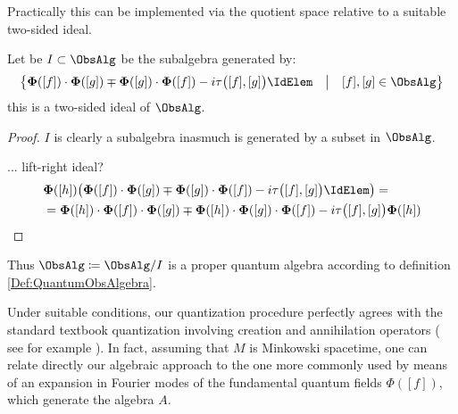 \documentclass[Main]{subfiles}
\begin{document}
   		 		Practically this can be implemented via the quotient space relative to a suitable two-sided ideal.
   		 		\begin{proposition}
   		 			Let be $I \subset \ObsAlg$ be the subalgebra generated by:
   		 				\begin{displaymath}
   		 					\big\{
   		 					 \mathbf{\Phi}([f]) \cdot \mathbf{\Phi}([g])  \mp \mathbf{\Phi}([g]) \cdot \mathbf{\Phi}([f]) - 
   		 				i \tau\big( [f], [g] \big)\IdElem \quad \big \vert \quad [f],[g]\in \ObsAlg
   		 					 \big\}
   		 				\end{displaymath}
   		 			this is a two-sided ideal of $\ObsAlg$.
   		 		\end{proposition}
   		 		\begin{proof}
   		 			$I$ is clearly a subalgebra inasmuch is generated by a subset in $\ObsAlg$.
   		 			
   		 			... 	\danger lift-right ideal?
					\begin{align*}
						& \mathbf{\Phi}([h])\big(
   		 					 \mathbf{\Phi}([f]) \cdot \mathbf{\Phi}([g])  \mp \mathbf{\Phi}([g]) \cdot \mathbf{\Phi}([f]) - 
   		 				i \tau\big( [f], [g] \big)\IdElem
   		 					 \big)=\\
   		 				&= \mathbf{\Phi}([h]) \cdot \mathbf{\Phi}([f]) \cdot \mathbf{\Phi}([g]) \mp  \mathbf{\Phi}([h]) \cdot \mathbf{\Phi}([g]) \cdot \mathbf{\Phi}([f])
   		 					 - i \tau\big( [f], [g] \big) \mathbf{\Phi}([h])
   		 			\end{align*}					   		 			
   		 		\end{proof}
   		 		Thus $\mathbf{\ObsAlg} \coloneqq \ObsAlg / I$ is a proper quantum algebra according to definition \ref{Def:QuantumObsAlgebra}.   			
   			
			\begin{remark}
			Under suitable conditions, our quantization procedure perfectly agrees with the standard textbook quantization involving creation and annihilation operators ( see for example \cite{Mandl}). 
			In fact, assuming that $M$ is Minkowski spacetime, one can relate directly our algebraic approach to the one more commonly used by means of an expansion in Fourier modes of the fundamental quantum fields $\Phi([ f ])$, which generate the algebra $A$.
			\end{remark}   			
   			
\end{document}
